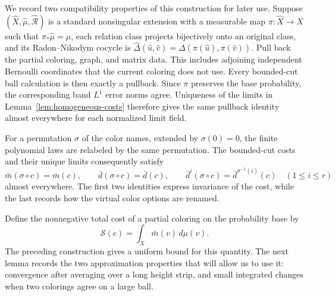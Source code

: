 We record two compatibility properties of this construction for later use.
Suppose $(\widehat X,\widehat\mu,\widehat{\mathcal R})$ is a standard
nonsingular extension with a measurable map $\pi:\widehat X\to X$ such that
$\pi_*\widehat\mu=\mu$, each relation class projects bijectively onto an
original class, and its Radon--Nikodym cocycle is
$\widehat\Delta(\widehat u,\widehat v)=\Delta(\pi(\widehat u),\pi(\widehat v))$.
Pull back the partial coloring, graph, and matrix data. This includes
adjoining independent Bernoulli coordinates that the current coloring does
not use. Every bounded-cut ball calculation is then exactly a pullback.
Since $\pi$ preserves the base probability, the corresponding band
$L^1$ error norms agree. Uniqueness of the limits in
Lemma~\ref{lem:homogeneous-costs} therefore gives the same pullback identity
almost everywhere for each normalized limit field.

For a permutation $\sigma$ of the color names, extended by $\sigma(0)=0$,
the finite polynomial laws are relabeled by the same permutation. The
bounded-cut costs and their unique limits consequently satisfy
\[
 \bar m(\sigma\circ c)=\bar m(c),\qquad
 \bar d(\sigma\circ c)=\bar d(c),\qquad
 \bar d^{i}(\sigma\circ c)=\bar d^{\sigma^{-1}(i)}(c)
 \quad(1\leq i\leq r)
\]
almost everywhere. The first two identities express invariance of the
cost, while the last records how the virtual color options are renamed.

Define the nonnegative total cost of a partial coloring on the probability
base by
\begin{equation}
 \mathcal S(c)=\int_X\bar m(v)\,d\mu(v).
 \label{eq:coloring-total-cost}
\end{equation}
The preceding construction gives a uniform bound for this quantity.
The next lemma records the two approximation properties that will allow
us to use it: convergence after averaging over a long height strip, and
small integrated changes when two colorings agree on a large ball.

